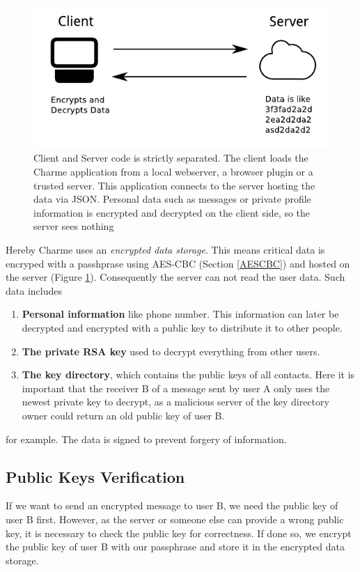 \documentclass{scrartcl}
\begin{document}
\begin{figure}[ht]
	\centering
  \includegraphics[]{eds.pdf}
	\caption{Client and Server code is strictly separated. The client loads the Charme application from a local webserver, a browser plugin or a trusted server. This application connects to the server hosting the data via JSON. Personal data such as messages or private profile information is encrypted and decrypted on the client side, so the server sees nothing}
	\label{fig1}
\end{figure}


Hereby Charme uses an \textit{encrypted data storage}. This means critical data is encryped with a passhprase using AES-CBC (Section \ref{AESCBC}) and hosted on the server  (Figure \ref{fig1}). Consequently the server can not read the user data. Such data includes
\begin{enumerate}
\item \textbf{Personal information} like phone number. This information can later be decrypted and encrypted with a public key to distribute it to other people.
\item \textbf{The private RSA key} used to decrypt everything from other users.
\item \textbf{The key directory}, which contains the public keys of all contacts. Here it is important that the receiver B of a message sent by user A only uses the newest private key to decrypt, as a malicious server of the key directory owner could return an old public key of user B.
\end{enumerate}
for example. The data is signed to prevent forgery of information.

\subsection{Public Keys Verification}
If we want to send an encrypted message to user B, we need the public key of user B first. However, as the server or someone else can provide a wrong public key, it is necessary to check the public key for correctness. If done so, we encrypt the public key of user B with our passphrase and store it in the encrypted data storage.
 
\end{document}
